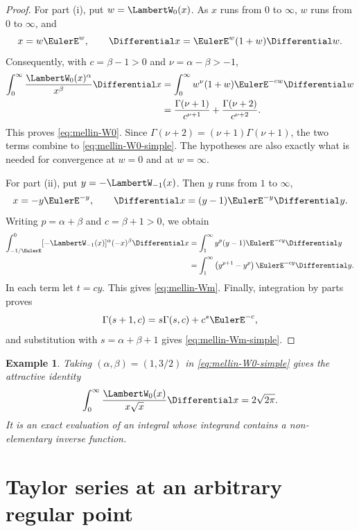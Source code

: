 \documentclass[11pt]{article}
\newtheorem{example}[example]{Example}
\theoremstyle{remark}
\newcommand{\Wz}{\LambertW_{0}}
\newcommand{\Wm}{\LambertW_{-1}}
\begin{document}
\begin{proof}
For part (i), put \(w=\Wz(x)\).  As \(x\) runs from \(0\) to
\(\infty\), \(w\) runs from \(0\) to \(\infty\), and
\[
 x=w\EulerE^w,\qquad \Differential x=\EulerE^w(1+w)\Differential w.
\]
Consequently, with \(c=\beta-1>0\) and
\(\nu=\alpha-\beta>-1\),
\begin{align*}
 \int_0^\infty \frac{\Wz(x)^\alpha}{x^\beta}\Differential x
 &=\int_0^\infty w^\nu(1+w)\EulerE^{-cw}\Differential w\\
 &=\frac{\Gamma(\nu+1)}{c^{\nu+1}}
   +\frac{\Gamma(\nu+2)}{c^{\nu+2}}.
\end{align*}
This proves \eqref{eq:mellin-W0}.  Since
\(\Gamma(\nu+2)=(\nu+1)\Gamma(\nu+1)\), the two terms combine to
\eqref{eq:mellin-W0-simple}.  The hypotheses are also exactly what is
needed for convergence at \(w=0\) and at \(w=\infty\).

For part (ii), put \(y=-\Wm(x)\).  Then \(y\) runs from \(1\) to
\(\infty\),
\[
       x=-y\EulerE^{-y},\qquad
       \Differential x=(y-1)\EulerE^{-y}\Differential y.
\]
Writing \(p=\alpha+\beta\) and \(c=\beta+1>0\), we obtain
\begin{align*}
 \int_{-1/\EulerE}^{0}[-\Wm(x)]^\alpha(-x)^\beta\Differential x
 &=\int_1^\infty y^p(y-1)\EulerE^{-cy}\Differential y\\
 &=\int_1^\infty
   \left(y^{p+1}-y^p\right)\EulerE^{-cy}\Differential y.
\end{align*}
In each term let \(t=cy\).  This gives \eqref{eq:mellin-Wm}.
Finally, integration by parts proves
\[
       \Gamma(s+1,c)=s\Gamma(s,c)+c^s\EulerE^{-c},
\]
and substitution with \(s=\alpha+\beta+1\) gives
\eqref{eq:mellin-Wm-simple}.
\end{proof}

\begin{example}
Taking \((\alpha,\beta)=(1,3/2)\) in
\eqref{eq:mellin-W0-simple} gives the attractive identity
\begin{equation}\label{eq:classic-mellin-example}
       \int_0^\infty\frac{\Wz(x)}{x\sqrt{x}}\Differential x
       =2\sqrt{2\pi}.
\end{equation}
It is an exact evaluation of an integral whose integrand contains a
non-elementary inverse function.
\end{example}

\section{Taylor series at an arbitrary regular point}\label{sec:localTaylor}
\end{document}
